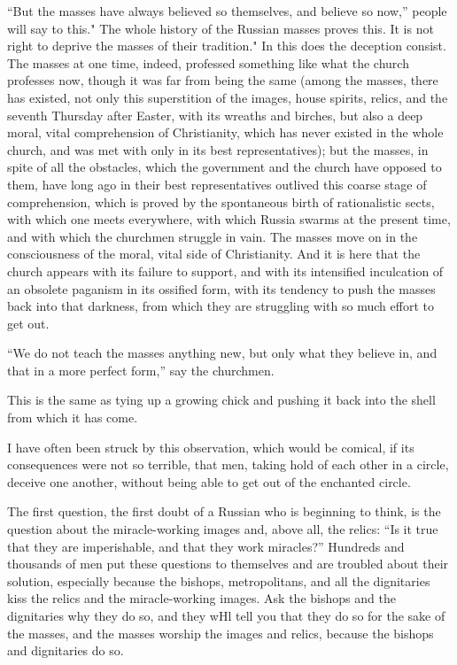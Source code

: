 \documentclass{book}
\begin{document}
“But the masses have always believed so themselves, and believe so now,” people will say to this." The whole history of the Russian masses proves this. It is not right to deprive the masses of their tradition." In this does the deception consist. The masses at one time, indeed, professed something like what the church professes now, though it was far from being the same (among the masses, there has existed, not only this superstition of the images, house spirits, relics, and the seventh Thursday after Easter, with its wreaths and birches, but also a deep moral, vital comprehension of Christianity, which has never existed in the whole church, and was met with only in its best representatives); but the masses, in spite of all the obstacles, which the government and the church have opposed to them, have long ago in their best representatives outlived this coarse stage of comprehension, which is proved by the spontaneous birth of rationalistic sects, with which one meets everywhere, with which Russia swarms at the present time, and with which the churchmen struggle in vain. The masses move on in the consciousness of the moral, vital side of Christianity. And it is here that the church appears with its failure to support, and with its intensified inculcation of an obsolete paganism in its ossified form, with its tendency to push the masses back into that darkness, from which they are struggling with so much effort to get out.

“We do not teach the masses anything new, but only what they believe in, and that in a more perfect form,” say the churchmen.

This is the same as tying up a growing chick and pushing it back into the shell from which it has come.

I have often been struck by this observation, which would be comical, if its consequences were not so terrible, that men, taking hold of each other in a circle, deceive one another, without being able to get out of the enchanted circle.

The first question, the first doubt of a Russian who is beginning to think, is the question about the miracle-working images and, above all, the relics: “Is it true that they are imperishable, and that they work miracles?” Hundreds and thousands of men put these questions to themselves and are troubled about their solution, especially because the bishops, metropolitans, and all the dignitaries kiss the relics and the miracle-working images. Ask the bishops and the dignitaries why they do so, and they wHl tell you that they do so for the sake of the masses, and the masses worship the images and relics, because the bishops and dignitaries do so.
\end{document}
